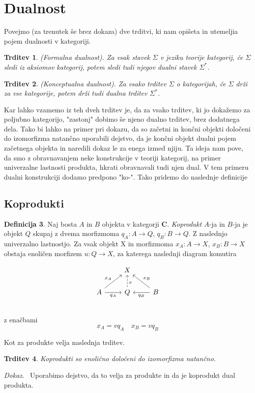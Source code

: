 \documentclass[12pt,a4paper]{book}
\theoremstyle{definition}
\newtheorem{definicija}{Definicija}[chapter]
\theoremstyle{plain}
\newtheorem{trditev}[definicija]{Trditev}
\newenvironment{dokaz}{\emph{Dokaz.}\ }{\hspace{\fill}{$\Box$}}
\theoremstyle{definition}
\theoremstyle{remark}
\newcommand{\cat}[1]{\textbf{#1}}
\begin{document}
\section{Dualnost}
Povejmo (za trenutek še brez dokaza) dve trditvi, ki nam opišeta in utemeljia pojem dualnosti v kategoriji.

\begin{trditev} \textit{(Formalna dualnost)}. 
Za vsak stavek $\Sigma$ v jeziku teorije kategorij, če $\Sigma$ sledi iz aksiomov kategorij, potem sledi tudi njegov dualni stavek $\Sigma^*$.
\end{trditev}

\begin{trditev} \textit{(Konceptualna dualnost)}.
Za vsako trditev $\Sigma$ o kategorijah, če $\Sigma$ drži za vse kategorije, potem drži tudi dualna trditev $\Sigma^*$.
\end{trditev}

Kar lahko vzamemo iz teh dveh trditev je, da za vsako trditev, ki jo dokažemo za poljubno kategorijo, "zastonj" dobimo še njeno dualno trditev, brez dodatnega dela. Tako bi lahko na primer pri dokazu, da so začetni in končni objekti določeni do izomorfizma natančno uporabili dejstvo, da je končni objekt dualni pojem začetnega objekta in naredili dokaz le za enega izmed njiju.
Ta ideja nam pove, da smo z obravnavanjem neke konstrukcije v teoriji kategorij, na primer univerzalne lastnosti produkta, hkrati obravnavali tudi njen dual. V tem primeru dualni konstrukciji dodamo predpono "ko-". Tako pridemo do naslednje definicije

\subsection{Koprodukti}
\begin{definicija}
Naj bosta $A$ in $B$ objekta v kategorji $\cat{C}$. \textit{Koprodukt} $A$-ja in $B$-ja je objekt $Q$ skupaj z dvema morfizmoma $q_A : A \to Q$, $q_B : B \to Q$. Z naslednjo univerzalno lastnostjo. Za vsak objekt X in morfizmoma $x_A : A \to X$, $x_B : B \to X$ obstaja enoličen morfizem $u : Q \to X$, za katerega naslednji diagram komutira

$$\begin{tikzcd}
& X & \\
A \ar[ur, "x_A"] \ar[r, "q_A"'] & Q \ar[u, dashed, pos=0.35, "v"']  & B \ar[l, "q_B"] \ar[ul, "x_B"'] \\
\end{tikzcd}$$
z enačbami
$$x_A = v q_A \quad x_B = v q_B$$
\end{definicija}
Kot za produkte velja naslednja trditev.
\begin{trditev}
Koprodukti so enolično določeni do izomorfizma natančno.
\end{trditev}
\begin{dokaz}
Uporabimo dejstvo, da to velja za produkte in da je koprodukt dual produkta.
\end{dokaz}
\end{document}
